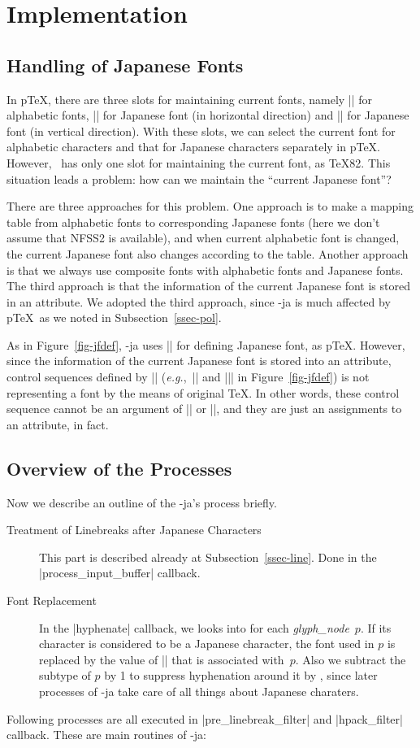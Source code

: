 \documentclass{ajt}
\begin{document}
\section{Implementation}
\subsection{Handling of Japanese Fonts}
In p\TeX, there are three slots for maintaining current fonts, namely
|\font| for alphabetic fonts, |\jfont| for Japanese font (in horizontal
direction) and |\tfont| for Japanese font (in vertical direction). With
these slots, we can select the current font for alphabetic characters
and that for Japanese characters separately in p\TeX.  However, \LuaTeX\
has only one slot for maintaining the current font, as \TeX82.  This
situation leads a problem: how can we maintain the ``current Japanese
font''?

There are three approaches for this problem. One approach is to make a
mapping table from alphabetic fonts to corresponding Japanese fonts
(here we don't assume that NFSS2 is available), and when current
alphabetic font is changed, the current Japanese font also changes
according to the table.  Another approach is that we always use
composite fonts with alphabetic fonts and Japanese fonts. The third
approach is that the information of the current Japanese font is stored
in an attribute. We adopted the third approach, since \LuaTeX-ja is much
affected by p\TeX\ as we noted in Subsection~\ref{ssec-pol}.

As in Figure~\ref{fig-jfdef}, \LuaTeX-ja uses |\jfont| for defining
Japanese font, as p\TeX.  However, since the information of the current
Japanese font is stored into an attribute, control sequences defined by
|\jfont| (\emph{e.g.},~|\foo| and |\bar| in Figure~\ref{fig-jfdef}) is
not representing a font by the means of original \TeX. In other words,
these control sequence cannot be an argument of |\the| or |\textfont|,
and they are just an assignments to an attribute, in fact.


\subsection{Overview of the Processes}
Now we describe an outline of the \LuaTeX-ja's process briefly.
\begin{description}
\item[Treatment of Linebreaks after Japanese Characters] This part is
	   described already at Subsection~\ref{ssec-line}. Done in the
	   |process_input_buffer| callback.
\item[Font Replacement] In the |hyphenate| callback, we looks into for
	   each \textit{glyph\_node}~$p$. If its character is considered
	   to be a Japanese character, the font used in $p$ is replaced
	   by the value of |\ltj@curjfnt| that is associated
	   with~$p$. Also we subtract the subtype of $p$ by 1 to
	   suppress hyphenation around it by \LuaTeX, since later
	   processes of \LuaTeX-ja take care of all things about
	   Japanese charaters.
\end{description}
%
Following processes are all executed in |pre_linebreak_filter| and
|hpack_filter| callback. These are main routines of \LuaTeX-ja:
\end{document}
